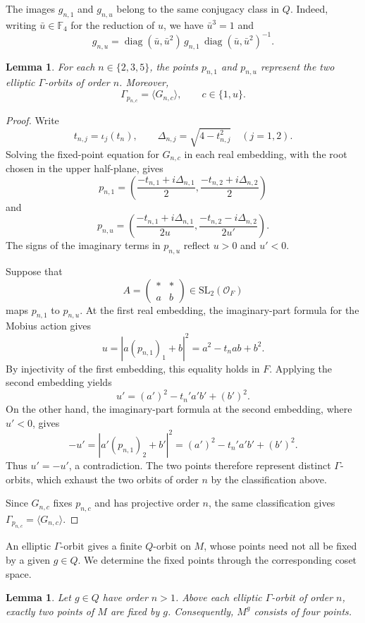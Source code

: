 \documentclass[11pt]{article}
\theoremstyle{definition}
\theoremstyle{plain}
\numberwithin{equation}{section}
\newtheorem{lemma}[theorem]{Lemma}
\begin{document}
The images $g_{n,1}$ and $g_{n,u}$ belong
to the same conjugacy class in $Q$.
Indeed, writing $\bar u\in\mathbb F_4$ for
the reduction of $u$, we have $\bar u^3=1$ and
\[
g_{n,u}
=\operatorname{diag}(\bar u,\bar u^2)\,
g_{n,1}\,
\operatorname{diag}(\bar u,\bar u^2)^{-1}.
\]

\begin{lemma}\label{lem:a5-orbits}
For each $n\in\{2,3,5\}$, the points
$p_{n,1}$ and $p_{n,u}$ represent the two
elliptic $\Gamma$-orbits of order $n$.
Moreover,
\[
\Gamma_{p_{n,c}}=\langle G_{n,c}\rangle,
\qquad c\in\{1,u\}.
\]
\end{lemma}

\begin{proof}
Write
\[
t_{n,j}=\iota_j(t_n),\qquad
\Delta_{n,j}=\sqrt{4-t_{n,j}^2}
\quad (j=1,2).
\]
Solving the fixed-point equation for
$G_{n,c}$ in each real embedding, with
the root chosen in the upper half-plane,
gives
\[
p_{n,1}=
\left(
\frac{-t_{n,1}+i\Delta_{n,1}}{2},
\frac{-t_{n,2}+i\Delta_{n,2}}{2}
\right)
\]
and
\[
p_{n,u}=
\left(
\frac{-t_{n,1}+i\Delta_{n,1}}{2u},
\frac{-t_{n,2}-i\Delta_{n,2}}{2u'}
\right).
\]
The signs of the imaginary terms in
$p_{n,u}$ reflect $u>0$ and $u'<0$.

Suppose that
\[
A=\begin{pmatrix}*&*\\a&b\end{pmatrix}
\in\mathrm{SL}_2(\mathcal O_F)
\]
maps $p_{n,1}$ to $p_{n,u}$.
At the first real embedding, the
imaginary-part formula for the Mobius
action gives
\[
u=|a(p_{n,1})_1+b|^2
=a^2-t_nab+b^2.
\]
By injectivity of the first embedding,
this equality holds in $F$. Applying
the second embedding yields
\[
u'=(a')^2-t_n'a'b'+(b')^2.
\]
On the other hand, the imaginary-part
formula at the second embedding, where
$u'<0$, gives
\[
-u'=|a'(p_{n,1})_2+b'|^2
=(a')^2-t_n'a'b'+(b')^2.
\]
Thus $u'=-u'$, a contradiction.
The two points therefore represent
distinct $\Gamma$-orbits, which exhaust
the two orbits of order $n$ by the
classification above.

Since $G_{n,c}$ fixes $p_{n,c}$ and
has projective order $n$, the same
classification gives
$\Gamma_{p_{n,c}}=\langle G_{n,c}\rangle$.
\end{proof}

An elliptic $\Gamma$-orbit gives a finite
$Q$-orbit on $M$, whose points need not
all be fixed by a given $g\in Q$.
We determine the fixed points through
the corresponding coset space.

\begin{lemma}\label{lem:a5-fixed-count}
Let $g\in Q$ have order $n>1$.
Above each elliptic $\Gamma$-orbit of
order $n$, exactly two points of $M$
are fixed by $g$. Consequently, $M^g$
consists of four points.
\end{lemma}
\end{document}
